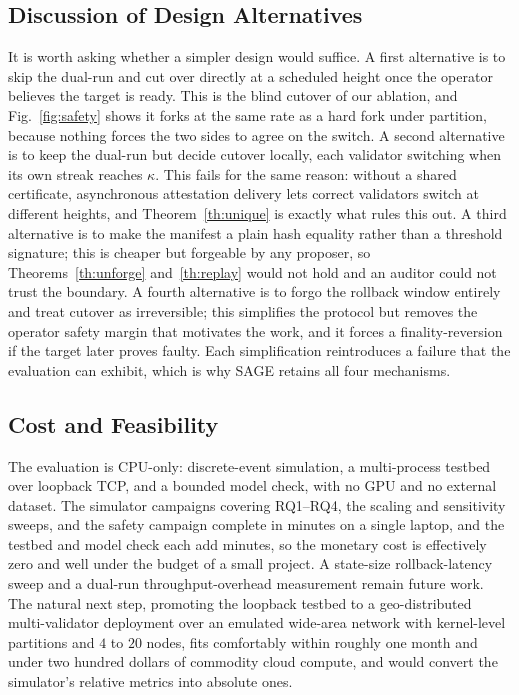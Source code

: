 \documentclass[journal]{IEEEtran}
\theoremstyle{remark}
\begin{document}
\subsection{Discussion of Design Alternatives}
It is worth asking whether a simpler design would suffice. A first alternative is to skip the
dual-run and cut over directly at a scheduled height once the operator believes the target is
ready. This is the blind cutover of our ablation, and Fig.~\ref{fig:safety} shows it forks at the
same rate as a hard fork under partition, because nothing forces the two sides to agree on the
switch. A second alternative is to keep the dual-run but decide cutover locally, each validator
switching when its own streak reaches $\kappa$. This fails for the same reason: without a shared
certificate, asynchronous attestation delivery lets correct validators switch at different
heights, and Theorem~\ref{th:unique} is exactly what rules this out. A third alternative is to
make the manifest a plain hash equality rather than a threshold signature; this is cheaper but
forgeable by any proposer, so Theorems~\ref{th:unforge} and~\ref{th:replay} would not hold and an
auditor could not trust the boundary. A fourth alternative is to forgo the rollback window
entirely and treat cutover as irreversible; this simplifies the protocol but removes the operator
safety margin that motivates the work, and it forces a finality-reversion if the target later
proves faulty. Each simplification reintroduces a failure that the evaluation can exhibit, which
is why SAGE retains all four mechanisms.

\subsection{Cost and Feasibility}
The evaluation is CPU-only: discrete-event simulation, a multi-process testbed over
loopback TCP, and a bounded model check, with no GPU and no external dataset. The simulator
campaigns covering RQ1--RQ4, the scaling and sensitivity sweeps, and the safety
campaign complete in minutes on a single laptop, and the testbed and model check each add minutes, so the
monetary cost is effectively zero and well under the budget of a small project. A state-size
rollback-latency sweep and a dual-run throughput-overhead measurement remain future
work. The natural next step, promoting the loopback testbed to a geo-distributed
multi-validator deployment over an emulated wide-area network with kernel-level partitions and
$4$ to $20$ nodes, fits comfortably within roughly one month and under two hundred dollars of
commodity cloud compute, and would convert the simulator's relative metrics into absolute ones.
\end{document}
